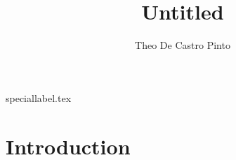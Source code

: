 \documentclass{article}
\title{Untitled}
\author{Theo De Castro Pinto}
\date{}
\begin{document}
\maketitle

\newpage
\tableofcontents
\newpage

{speciallabel.tex}

\newpage

\section{Introduction}

\newpage

\end{document}
